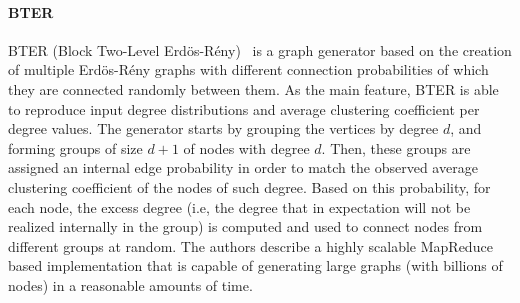 
\paragraph{BTER} BTER (Block Two-Level
Erd\"{o}s-R\'{e}ny)~\cite{kolda2014scalable} is a graph generator based on the
creation of multiple Erd\"{o}s-R\'{e}ny graphs with different connection
probabilities  of which they are connected randomly between them. As the main feature, BTER is able
to reproduce input degree distributions and average clustering
coefficient per degree values. The generator starts by grouping the vertices
by degree $d$, and forming groups of size $d+1$ of nodes with degree $d$. Then, these
groups are assigned an internal edge probability in order to match the observed
average clustering coefficient of the nodes of such degree. Based on this
probability, for each node, the excess degree (i.e, the degree that in
expectation will not be realized internally in the group) is computed and used to connect
nodes from different groups at random. The authors describe a highly scalable
MapReduce based implementation that is capable of generating large graphs (with
billions of nodes) in a reasonable amounts of time.

